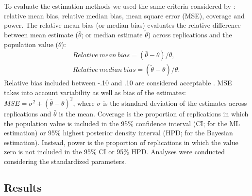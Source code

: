 \documentclass[graybox]{svmult}
\begin{document}
To evaluate the estimation methods we used the same criteria considered by \cite{smidSemSmallSamples2020}: relative mean bias, relative median bias, mean square error (MSE), coverage and power. The relative mean bias (or median bias) evaluates the relative difference between mean estimate ($\bar{\theta}$; or median estimate $\widetilde{\theta}$) across replications and the population value ($\theta$):
\begin{eqnarray}
Relative\ mean\ bias = (\bar{\theta}-\theta)/\theta,\\
Relative\ median\ bias = (\widetilde{\theta}-\theta)/\theta.
\end{eqnarray}
Relative bias included between -.10 and .10 are considered acceptable \cite{smidSemSmallSamples2020}. MSE takes into account variability as well as bias of the estimates: $MSE = \sigma^2 + (\bar{\theta}- \theta)^2$, where $\sigma$ is the standard deviation of the estimates across replications and $\bar{\theta}$ is the mean. Coverage is the proportion of replications in which the population value is included in the 95\% confidence interval (CI; for the ML estimation) or 95\% highest posterior density interval (HPD; for the Bayesian estimation). Instead, power is the proportion of replications in which the value zero is not included in the 95\% CI or 95\% HPD. Analyses were conducted considering the standardized parameters.

\subsection{Results}
\end{document}
